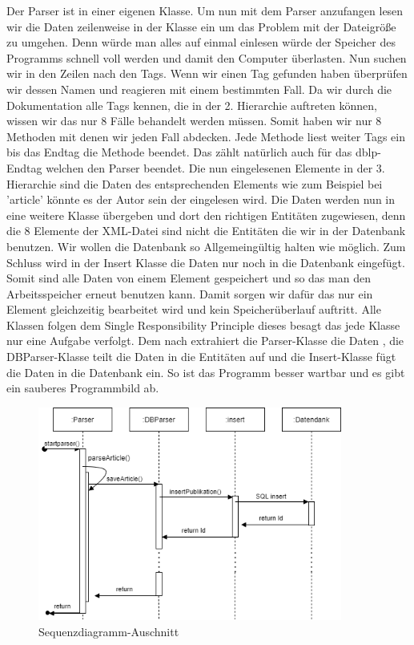 Der Parser ist in einer eigenen Klasse. Um nun mit dem Parser anzufangen lesen wir die Daten zeilenweise in der Klasse ein um das Problem mit der Dateigröße zu umgehen. Denn würde man alles auf einmal einlesen würde der Speicher des Programms schnell voll werden und damit den Computer überlasten. Nun suchen wir in den Zeilen nach den Tags. Wenn wir einen Tag gefunden haben überprüfen wir dessen Namen und reagieren mit einem bestimmten Fall. Da wir durch die Dokumentation alle Tags kennen, die in der 2. Hierarchie auftreten können, wissen wir das nur 8 Fälle behandelt werden müssen. Somit haben wir nur 8 Methoden mit denen wir jeden Fall abdecken. Jede Methode liest weiter Tags ein bis das Endtag die Methode beendet. Das zählt natürlich auch für das dblp-Endtag welchen den Parser beendet. Die nun eingelesenen Elemente in der 3. Hierarchie sind die Daten des entsprechenden Elements wie zum Beispiel bei 'article' könnte es der Autor sein der eingelesen wird. Die Daten werden nun in eine weitere Klasse übergeben und dort den richtigen Entitäten zugewiesen, denn die 8 Elemente der XML-Datei sind nicht die Entitäten die wir in der Datenbank benutzen. Wir wollen die Datenbank so Allgemeingültig halten wie möglich. Zum Schluss wird in der Insert Klasse die Daten nur noch in die Datenbank eingefügt. Somit sind alle Daten von einem Element gespeichert und so das man den Arbeitsspeicher erneut benutzen kann. Damit sorgen wir dafür das nur ein Element gleichzeitig bearbeitet wird und kein Speicherüberlauf auftritt. Alle Klassen folgen dem Single Responsibility Principle dieses besagt das jede Klasse nur eine Aufgabe verfolgt. Dem nach extrahiert die Parser-Klasse die Daten , die DBParser-Klasse teilt die Daten in die Entitäten auf und die Insert-Klasse fügt die Daten in die Datenbank ein. So ist das Programm besser wartbar und es gibt ein sauberes Programmbild ab.
\newpage
\begin{figure}[!htb]
	\centering
	\includegraphics[width=10cm,keepaspectratio]{bilder/SequenzDiagramParser}
	\caption{Sequenzdiagramm-Auschnitt}
	\label{fig:sequenzdiagramm}
\end{figure}

